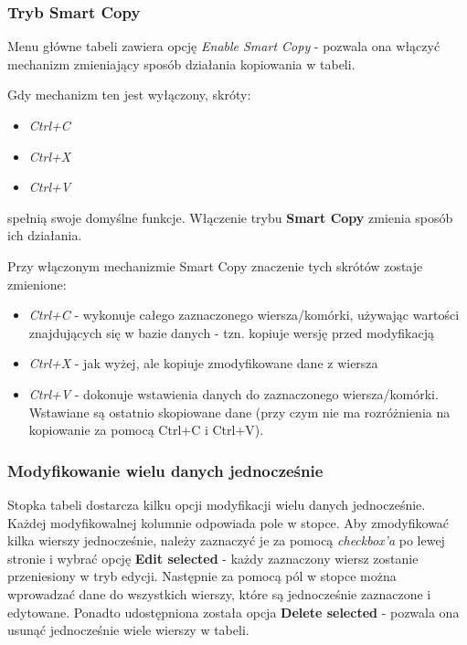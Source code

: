 \documentclass[12pt] {article}
\begin{document}
\subsubsection{Tryb Smart Copy}
Menu główne tabeli zawiera opcję \emph{Enable Smart Copy} - pozwala ona włączyć mechanizm zmieniający sposób działania kopiowania w tabeli. 

Gdy mechanizm ten jest wyłączony, skróty:
\begin{itemize}
\item \emph{Ctrl+C}
\item \emph{Ctrl+X}
\item \emph{Ctrl+V}
\end{itemize}
spełnią swoje domyślne funkcje. Włączenie trybu \textbf{Smart Copy} zmienia sposób ich działania.

Przy włączonym mechanizmie Smart Copy znaczenie tych skrótów zostaje zmienione:
\begin{itemize}
\item \emph{Ctrl+C} - wykonuje całego zaznaczonego wiersza/komórki, używając wartości znajdujących się w bazie danych - tzn. kopiuje wersję przed modyfikacją
\item \emph{Ctrl+X} - jak wyżej, ale kopiuje zmodyfikowane dane z wiersza
\item \emph{Ctrl+V} - dokonuje wstawienia danych do zaznaczonego wiersza/komórki. Wstawiane są ostatnio skopiowane dane (przy czym nie ma rozróżnienia na kopiowanie za pomocą Ctrl+C i Ctrl+V).
\end{itemize} 

\subsubsection{Modyfikowanie wielu danych jednocześnie}
Stopka tabeli dostarcza kilku opcji modyfikacji wielu danych jednocześnie. Każdej modyfikowalnej kolumnie odpowiada pole w stopce. Aby zmodyfikować kilka wierszy jednocześnie, należy zaznaczyć je za pomocą \emph{checkbox'a} po lewej stronie i wybrać opcję \textbf{Edit selected} - każdy zaznaczony wiersz zostanie przeniesiony w tryb edycji. Następnie za pomocą pól w stopce można wprowadzać dane do wszystkich wierszy, które są jednocześnie zaznaczone i edytowane. Ponadto udostępniona została opcja \textbf{Delete selected} - pozwala ona usunąć jednocześnie wiele wierszy w tabeli. 
\end{document}
